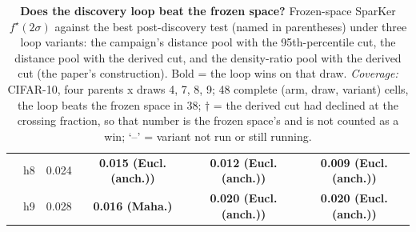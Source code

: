 \begin{table}[t]
\begin{tabular}{llcccc}
 & h8 & 0.024 & \textbf{0.015 (Eucl. (anch.))} & \textbf{0.012 (Eucl. (anch.))} & \textbf{0.009 (Eucl. (anch.))} \\
 & h9 & 0.028 & \textbf{0.016 (Maha.)} & \textbf{0.020 (Eucl. (anch.))} & \textbf{0.020 (Eucl. (anch.))} \\
\bottomrule
\end{tabular}
\caption{\textbf{Does the discovery loop beat the frozen space?} Frozen-space SparKer $f^\star(2\sigma)$ against the best post-discovery test (named in parentheses) under three loop variants: the campaign's distance pool with the 95th-percentile cut, the distance pool with the derived cut, and the density-ratio pool with the derived cut (the paper's construction). Bold = the loop wins on that draw. \emph{Coverage:} CIFAR-10, four parents x draws {4, 7, 8, 9}; 48 complete (arm, draw, variant) cells, the loop beats the frozen space in 38; $\dagger$ = the derived cut had declined at the crossing fraction, so that number is the frozen space's and is not counted as a win; `--' = variant not run or still running.}
\label{tab:sigma_summary_cifar10}
\end{table}
